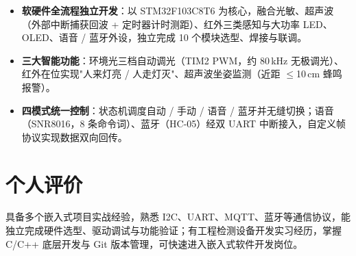 \documentclass[10pt,a4paper]{article}
\begin{document}
\begin{itemize}[leftmargin=1.5em, itemsep=2pt, parsep=0pt, topsep=2pt]
    \item \textbf{软硬件全流程独立开发}：以 STM32F103C8T6 为核心，融合光敏、超声波（外部中断捕获回波 + 定时器计时测距）、红外三类感知与大功率 LED、OLED、语音 / 蓝牙外设，独立完成 10 个模块选型、焊接与联调。
    \item \textbf{三大智能功能}：环境光三档自动调光（TIM2 PWM，约 80\,kHz 无极调光）、红外在位实现"人来灯亮 / 人走灯灭"、超声波坐姿监测（近距 $\leq$10\,cm 蜂鸣报警）。
    \item \textbf{四模式统一控制}：状态机调度自动 / 手动 / 语音 / 蓝牙并无缝切换；语音（SNR8016，8 条命令词）、蓝牙（HC-05）经双 UART 中断接入，自定义帧协议实现数据双向回传。
\end{itemize}

\vspace{0.1em}

\section{\faUser\hspace{0.4em}个人评价}

具备多个嵌入式项目实战经验，熟悉 I2C、UART、MQTT、蓝牙等通信协议，能独立完成硬件选型、驱动调试与功能验证；有工程检测设备开发实习经历，掌握 C/C++ 底层开发与 Git 版本管理，可快速进入嵌入式软件开发岗位。
\end{document}
